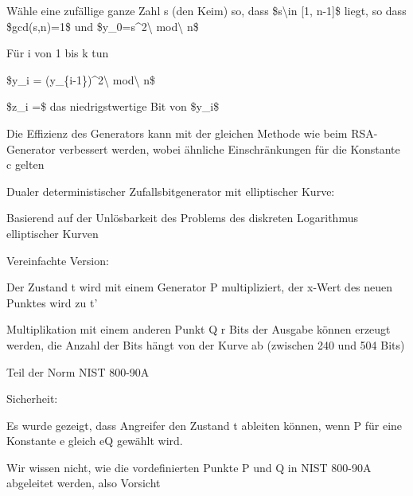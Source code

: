 \documentclass[a4paper]{article}
\begin{document}
\begin{multicols}{3}
\begin{itemize*}
\begin{enumerate*}
                  \item Wähle eine zufällige ganze Zahl s (den Keim) so, dass \$s\textbackslash in {[}1, n-1{]}\$ liegt, so dass \$gcd(s,n)=1\$ und \$y\_0=s\^{}2\textbackslash{} mod\textbackslash{} n\$
                  \item Für i von 1 bis k tun
                  \begin{enumerate*} \def\labelenumii{\arabic{enumii}.} \item \$y\_i = (y\_\{i-1\})\^{}2\textbackslash{} mod\textbackslash{} n\$ \item \$z\_i =\$ das niedrigstwertige Bit von \$y\_i\$ \end{enumerate*}
            \end{enumerate*}
            \begin{itemize*}
                  \item Die Effizienz des Generators kann mit der gleichen Methode wie beim RSA-Generator verbessert werden, wobei ähnliche Einschränkungen für die Konstante c gelten
            \end{itemize*}
            \item Dualer deterministischer Zufallsbitgenerator mit elliptischer Kurve:
            \begin{itemize*}
                  \item Basierend auf der Unlösbarkeit des Problems des diskreten Logarithmus elliptischer Kurven
                  \item Vereinfachte Version: %
                  \item Der Zustand t wird mit einem Generator P multipliziert, der x-Wert des neuen Punktes wird zu t'
                  \item Multiplikation mit einem anderen Punkt Q r Bits der Ausgabe können erzeugt werden, die Anzahl der Bits hängt von der Kurve ab (zwischen 240 und 504 Bits)
                  \item Teil der Norm NIST 800-90A
                  \item Sicherheit:
                  \begin{itemize*} \item Es wurde gezeigt, dass Angreifer den Zustand t ableiten können, wenn P für eine Konstante e gleich eQ gewählt wird. \item Wir wissen nicht, wie die vordefinierten Punkte P und Q in NIST 800-90A abgeleitet werden, also Vorsicht \end{itemize*}
            \end{itemize*}
      \end{itemize*}



\end{multicols}
\end{document}
